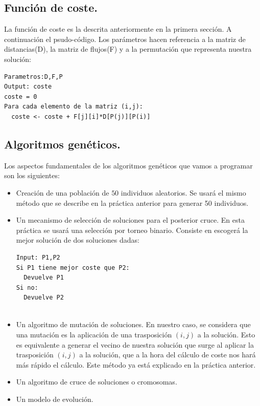 \subsection{Función de coste.}

La función de coste es la descrita anteriormente en la primera sección. A continuación el psudo-código. Los parámetros hacen referencia a la matriz de distancias(D), la matriz de flujos(F) y a la permutación que representa nuestra solución:\\

\begin{lstlisting}
Parametros:D,F,P
Output: coste
coste = 0
Para cada elemento de la matriz (i,j):
  coste <- coste + F[j][i]*D[P(j)][P(i)]
\end{lstlisting}


\subsection{Algoritmos genéticos.}
Los aspectos fundamentales de los algoritmos genéticos que vamos a programar son los siguientes:\\

\begin{itemize}
	\item Creación de una población de $50$ individuos aleatorios. Se usará el mismo método que se describe en la práctica anterior para generar 50 individuos.
	
	\item Un mecanismo de selección de soluciones para el posterior cruce. En esta práctica se usará una selección por torneo binario. Consiste en escogerá la mejor solución de dos soluciones dadas:\\
	
	\begin{lstlisting}
Input: P1,P2
Si P1 tiene mejor coste que P2:
  Devuelve P1
Si no:
  Devuelve P2
	
	\end{lstlisting}
	
	\item Un algoritmo de mutación de soluciones. En nuestro caso, se considera que una mutación es la aplicación de una trasposición $(i,j)$ a la solución. Esto es equivalente a generar el vecino de nuestra solución que surge al aplicar la trasposición $(i,j)$ a la solución, que a la hora del cálculo de coste nos hará más rápido el cálculo. Este método ya está explicado en la práctica anterior.
	
	\item Un algoritmo de cruce de soluciones o cromosomas.
	
	\item Un modelo de evolución.
\end{itemize}

